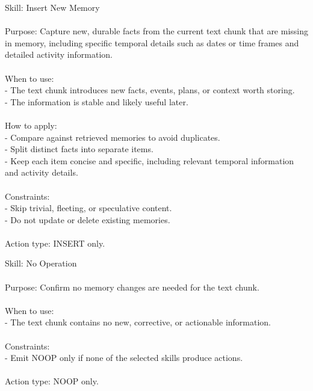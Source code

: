 \begin{center}
\begin{tcolorbox}[
  title={Evolved Skill on LoCoMo - INSERT},
  colback=blue!2!white,
  colframe=blue!35!black,
  colbacktitle=blue!15!white,
  coltitle=black,
  coltext=black
]
{
Skill: Insert New Memory \\\\
Purpose: Capture new, durable facts from the current text chunk that are missing in memory, including specific temporal details such as dates or time frames and detailed activity information. \\\\
When to use: \\
- The text chunk introduces new facts, events, plans, or context worth storing. \\
- The information is stable and likely useful later. \\\\
How to apply: \\
- Compare against retrieved memories to avoid duplicates. \\
- Split distinct facts into separate items. \\
- Keep each item concise and specific, including relevant temporal information and activity details. \\\\
Constraints: \\
- Skip trivial, fleeting, or speculative content. \\
- Do not update or delete existing memories. \\\\
Action type: INSERT only.
}
\label{appendix:case_insert}
\end{tcolorbox}
\end{center}

\begin{center}
\begin{tcolorbox}[
  title={Evolved Skill on LoCoMo - NOOP},
  colback=blue!2!white,
  colframe=blue!35!black,
  colbacktitle=blue!15!white,
  coltitle=black,
  coltext=black
]
{
Skill: No Operation \\\\
Purpose: Confirm no memory changes are needed for the text chunk. \\\\
When to use: \\
- The text chunk contains no new, corrective, or actionable information. \\\\
Constraints: \\
- Emit NOOP only if none of the selected skills produce actions. \\\\
Action type: NOOP only.
}
\label{appendix:case_noop}
\end{tcolorbox}
\end{center}

